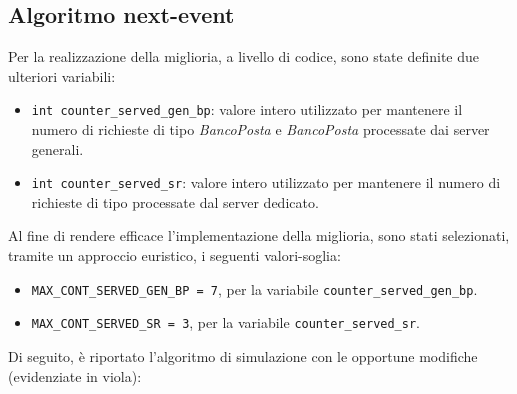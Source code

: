 \subsection{Algoritmo next-event}
Per la realizzazione della miglioria, a livello di codice, sono state definite due ulteriori variabili:
\begin{itemize}
\item \texttt{{\color{code_purple}int} counter\_served\_gen\_bp}: valore intero utilizzato per mantenere il numero di richieste di tipo \uo{} \textsl{BancoPosta} e \pp{} \textsl{BancoPosta} processate dai server generali.
\item \texttt{{\color{code_purple}int} counter\_served\_sr}: valore intero utilizzato per mantenere il numero di richieste di tipo \sr{} processate dal server dedicato.
\end{itemize}
Al fine di rendere efficace l'implementazione della miglioria, sono stati selezionati, tramite un approccio euristico, i seguenti valori-soglia:
\begin{itemize}
\item \texttt{MAX\_CONT\_SERVED\_GEN\_BP = 7}, per la variabile \texttt{counter\_served\_gen\_bp}.
\item \texttt{MAX\_CONT\_SERVED\_SR = 3}, per la variabile \texttt{counter\_served\_sr}.
\end{itemize}
Di seguito, è riportato l'algoritmo di simulazione con le opportune modifiche (evidenziate in {\color{purple}viola}):
